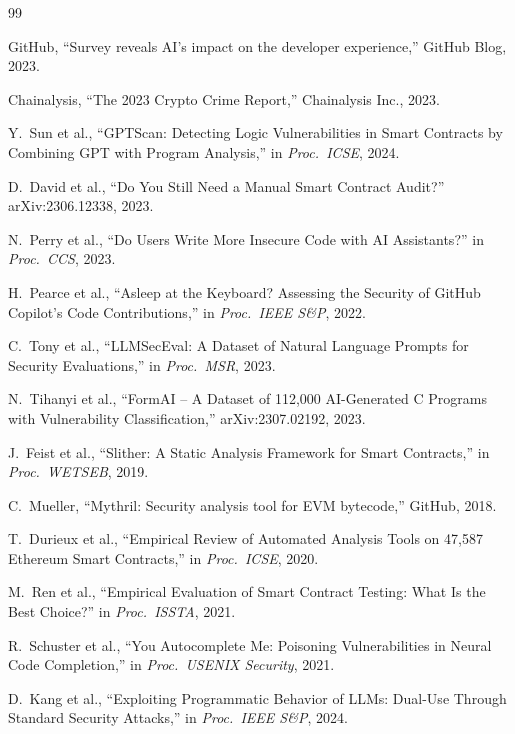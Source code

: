 \documentclass[11pt]{article}
\begin{document}
{\footnotesize
\begin{thebibliography}{99}
\setlength{\itemsep}{1pt}
\setlength{\parsep}{0pt}

 GitHub, ``Survey reveals AI's impact on the developer experience,'' GitHub Blog, 2023.

 Chainalysis, ``The 2023 Crypto Crime Report,'' Chainalysis Inc., 2023.

 Y.~Sun et al., ``GPTScan: Detecting Logic Vulnerabilities in Smart Contracts by Combining GPT with Program Analysis,'' in \textit{Proc.\ ICSE}, 2024.

 D.~David et al., ``Do You Still Need a Manual Smart Contract Audit?'' arXiv:2306.12338, 2023.

 N.~Perry et al., ``Do Users Write More Insecure Code with AI Assistants?'' in \textit{Proc.\ CCS}, 2023.

 H.~Pearce et al., ``Asleep at the Keyboard? Assessing the Security of GitHub Copilot's Code Contributions,'' in \textit{Proc.\ IEEE S\&P}, 2022.

 C.~Tony et al., ``LLMSecEval: A Dataset of Natural Language Prompts for Security Evaluations,'' in \textit{Proc.\ MSR}, 2023.

 N.~Tihanyi et al., ``FormAI -- A Dataset of 112,000 AI-Generated C Programs with Vulnerability Classification,'' arXiv:2307.02192, 2023.

 J.~Feist et al., ``Slither: A Static Analysis Framework for Smart Contracts,'' in \textit{Proc.\ WETSEB}, 2019.

 C.~Mueller, ``Mythril: Security analysis tool for EVM bytecode,'' GitHub, 2018.

 T.~Durieux et al., ``Empirical Review of Automated Analysis Tools on 47,587 Ethereum Smart Contracts,'' in \textit{Proc.\ ICSE}, 2020.

 M.~Ren et al., ``Empirical Evaluation of Smart Contract Testing: What Is the Best Choice?'' in \textit{Proc.\ ISSTA}, 2021.

 R.~Schuster et al., ``You Autocomplete Me: Poisoning Vulnerabilities in Neural Code Completion,'' in \textit{Proc.\ USENIX Security}, 2021.

 D.~Kang et al., ``Exploiting Programmatic Behavior of LLMs: Dual-Use Through Standard Security Attacks,'' in \textit{Proc.\ IEEE S\&P}, 2024.


\end{thebibliography}}
\end{document}
